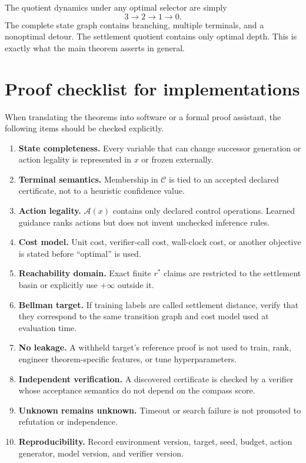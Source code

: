 \documentclass[11pt,letterpaper]{article}
\theoremstyle{remark}
\newcommand{\Cset}{\mathcal C}
\newcommand{\A}{\mathcal A}
\newcommand{\rstar}{r^{\!*}}
\begin{document}
The quotient dynamics under any optimal selector are simply
\[
3\to2\to1\to0.
\]
The complete state graph contains branching, multiple terminals, and a nonoptimal detour. The settlement quotient contains only optimal depth. This is exactly what the main theorem asserts in general.

\section{Proof checklist for implementations}\label{app:checklist}

When translating the theorems into software or a formal proof assistant, the following items should be checked explicitly.

\begin{enumerate}
\item \textbf{State completeness.} Every variable that can change successor generation or action legality is represented in $x$ or frozen externally.
\item \textbf{Terminal semantics.} Membership in $\Cset$ is tied to an accepted declared certificate, not to a heuristic confidence value.
\item \textbf{Action legality.} $\A(x)$ contains only declared control operations. Learned guidance ranks actions but does not invent unchecked inference rules.
\item \textbf{Cost model.} Unit cost, verifier-call cost, wall-clock cost, or another objective is stated before ``optimal'' is used.
\item \textbf{Reachability domain.} Exact finite $\rstar$ claims are restricted to the settlement basin or explicitly use $+\infty$ outside it.
\item \textbf{Bellman target.} If training labels are called settlement distance, verify that they correspond to the same transition graph and cost model used at evaluation time.
\item \textbf{No leakage.} A withheld target's reference proof is not used to train, rank, engineer theorem-specific features, or tune hyperparameters.
\item \textbf{Independent verification.} A discovered certificate is checked by a verifier whose acceptance semantics do not depend on the compass score.
\item \textbf{Unknown remains unknown.} Timeout or search failure is not promoted to refutation or independence.
\item \textbf{Reproducibility.} Record environment version, target, seed, budget, action generator, model version, and verifier version.
\end{enumerate}
\end{document}
